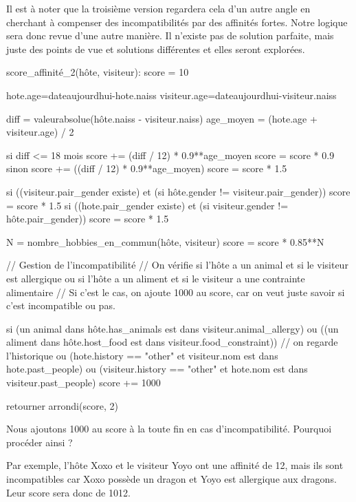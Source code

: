 \documentclass{mytex}
\begin{document}
Il est à noter que la troisième version regardera cela d'un autre angle en cherchant à compenser des incompatibilités par des affinités fortes. Notre logique sera donc revue d'une autre manière.
Il n'existe pas de solution parfaite, mais juste des points de vue et solutions différentes et elles seront explorées.

\begin{codebox}
score_affinité_2(hôte, visiteur):
    score = 10

    hote.age=dateaujourdhui-hote.naiss
    visiteur.age=dateaujourdhui-visiteur.naiss

    diff = valeurabsolue(hôte.naiss - visiteur.naiss) 
    age_moyen = (hote.age + visiteur.age) / 2

    si diff <= 18 mois
        score += (diff / 12) * 0.9**age_moyen
	    score = score * 0.9
    sinon 
        score += ((diff / 12) * 0.9**age_moyen) 
	    score = score * 1.5

    si ((visiteur.pair_gender existe) et (si hôte.gender != visiteur.pair_gender))
	        score = score * 1.5
    si ((hote.pair_gender existe) et (si visiteur.gender != hôte.pair_gender))
	        score = score * 1.5

    N = nombre_hobbies_en_commun(hôte, visiteur)
        score = score * 0.85**N

    // Gestion de l'incompatibilité
    // On vérifie si l'hôte a un animal et si le visiteur est allergique ou si l'hôte a un aliment et si le visiteur a une contrainte alimentaire
    // Si c'est le cas, on ajoute 1000 au score, car on veut juste savoir si c'est incompatible ou pas.

    si (un animal dans hôte.has_animals est dans visiteur.animal_allergy) 
    ou ((un aliment dans hôte.host_food est dans visiteur.food_constraint)) 
    // on regarde l'historique
    ou (hote.history == "other" et visiteur.nom est dans hote.past_people)
    ou (visiteur.history == "other" et hote.nom est dans visiteur.past_people)
        score += 1000

    retourner arrondi(score, 2)
\end{codebox}


Nous ajoutons 1000 au score à la toute fin en cas d'incompatibilité. Pourquoi procéder ainsi ?

Par exemple, l'hôte Xoxo et le visiteur Yoyo ont une affinité de 12, mais ils sont incompatibles car Xoxo possède un dragon et Yoyo est allergique aux dragons.
Leur score sera donc de 1012.
\end{document}
